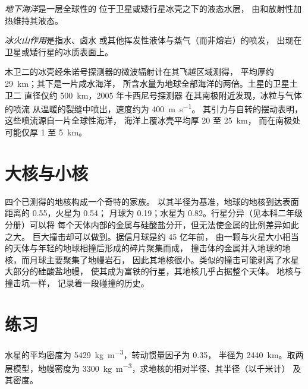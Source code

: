\begin{definition}[地下海洋]\label{def:b3:planetary-interiors-surfaces:ocean-world}
\emph{地下海洋}是一层全球性的
位于卫星或矮行星冰壳之下的液态水层，
由和放射性加热维持其液态。
\end{definition}

\begin{definition}[冰火山作用]\label{def:b3:planetary-interiors-surfaces:cryovolcanism}
\emph{冰火山作用}是指水、卤水
或其他挥发性液体与蒸气（而非熔岩）的喷发，
出现在卫星或矮行星的冰质表面上。
\end{definition}

木卫二的冰壳经朱诺号探测器的微波辐射计在其飞越区域测得，
平均厚约 \qty{29}{km}；其下是一片咸水海洋，
所含水量为地球全部海洋的两倍。土星的卫星土卫二
直径仅约 \qty{500}{km}，2005 年卡西尼号探测器
在其南极附近发现，冰粒与气体的喷流
从温暖的裂缝中喷出，速度约为 \qty{400}{m.s^{-1}}。
其引力与自转的摆动表明，
这些喷流源自一片全球性海洋，
海洋上覆冰壳平均厚 20 至 \qty{25}{km}，
而在南极处可能仅厚 1 至 \qty{5}{km}。

\section{大核与小核}\label{sec:b3:planetary-interiors-surfaces:cores}

四个已测得的地核构成一个奇特的家族。
以其半径为基准，地球的地核到达表面距离的 0.55，火星为 0.54；
月球为 0.19；水星为 0.82。行星分异（见本科二年级分册）可以将
每个天体内部的金属与硅酸盐分开，但无法使金属的比例差异如此之大。
巨大撞击却可以做到。据信月球是约 45 亿年前，
由一颗与火星大小相当的天体与年轻的地球相撞后形成的碎片聚集而成，
撞击体的金属并入地球的地核，而月球主要聚集了地幔岩石，
因此其地核很小。类似的撞击可能剥离了水星大部分的硅酸盐地幔，
使其成为富铁的行星，其地核几乎占据整个天体。
地核与撞击坑一样，
记录着一段碰撞的历史。

\section{练习}

\begin{exercise}[$\star$]\label{exo:b3:planetary-interiors-surfaces:1}
水星的平均密度为 \qty{5429}{kg.m^{-3}}，转动惯量因子为 0.35，
半径为 \qty{2440}{km}。取两层模型，地幔密度为
\qty{3300}{kg.m^{-3}}，求地核的相对半径、其半径（以千米计）
及其密度。
\end{exercise}

